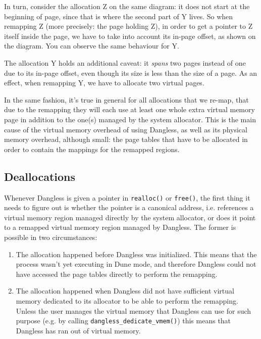 In turn, consider the allocation Z on the same diagram: it does not start at the beginning of page, since that is where the second part of Y lives. So when remapping Z (more precisely: the page holding Z), in order to get a pointer to Z itself inside the page, we have to take into account its in-page offset, as shown on the diagram. You can observe the same behaviour for Y.

The allocation Y holds an additional caveat: it \emph{spans} two pages instead of one due to its in-page offset, even though its size is less than the size of a page. As an effect, when remapping Y, we have to allocate two virtual pages.

In the same fashion, it's true in general for all allocations that we re-map, that due to the remapping they will each use at least one whole extra virtual memory page in addition to the one(s) managed by the system allocator. This is the main cause of the virtual memory overhead of using Dangless, as well as its physical memory overhead, although small: the page tables that have to be allocated in order to contain the mappings for the remapped regions.

\subsection{Deallocations}
\label{ssec:deallocations}

Whenever Dangless is given a pointer in \lstinline!realloc()! or \lstinline!free()!, the first thing it needs to figure out is whether the pointer is a canonical address, i.e. references a virtual memory region managed directly by the system allocator, or does it point to a remapped virtual memory region managed by Dangless. The former is possible in two circumstances:

\begin{enumerate}
	\item The allocation happened before Dangless was initialized. This means that the process wasn't yet executing in Dune mode, and therefore Dangless could not have accessed the page tables directly to perform the remapping.
	\item The allocation happened when Dangless did not have sufficient virtual memory dedicated to its allocator to be able to perform the remapping. Unless the user manages the virtual memory that Dangless can use for such purpose (e.g. by calling \lstinline!dangless_dedicate_vmem()!) this means that Dangless has ran out of virtual memory.
\end{enumerate}

